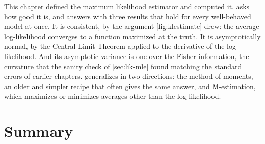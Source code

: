 This chapter defined the maximum likelihood estimator and computed it.
 asks how good it is, and answers with three results that hold for every well-behaved model at once.
It is consistent, by the argument \cref{fig:klestimate} drew: the average log-likelihood converges to a function maximized at the truth.
It is asymptotically normal, by the Central Limit Theorem applied to the derivative of the log-likelihood.
And its asymptotic variance is one over the Fisher information, the curvature that the sanity check of \cref{sec:lik-mle} found matching the standard errors of earlier chapters.
 generalizes in two directions: the method of moments, an older and simpler recipe that often gives the same answer, and M-estimation, which maximizes or minimizes averages other than the log-likelihood.

\section{Summary}
\label{sec:lik-summary}


